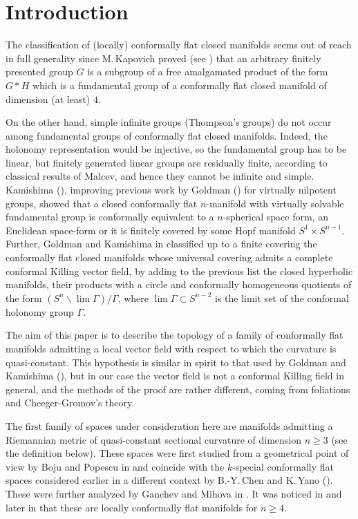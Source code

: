 \documentclass[JEP,XML,SOM,Unicode]{cedram}
\let\moins\smallsetminus
\theoremstyle{definition}
\theoremstyle{remark}
\numberwithin{equation}{section}
\begin{document}
\section{Introduction}
The classification of (locally) conformally flat closed manifolds
seems out of reach in full generality since M.\,Kapovich proved (see \cite{Ka})
that an arbitrary finitely presented group $G$ is a subgroup
of a free amalgamated product of the form
$G * H$ which is a fundamental group of a conformally
flat closed manifold of dimension (at least) $4$.

On the other hand, simple infinite groups (\eg Thompson's groups) do not occur
among fundamental groups of conformally flat closed manifolds. Indeed, the holonomy
representation would be injective, so the fundamental group has to be linear, but finitely generated
linear groups are residually finite, according to classical results of Malcev, and hence they cannot be infinite and simple.
Kamishima (\cite{Kam}), improving previous work by
Goldman (\cite{Go}) for virtually nilpotent groups, showed that a closed conformally flat
$n$-manifold with virtually solvable
fundamental group is conformally equivalent to a
$n$-spherical space form, an Euclidean space-form or it is
finitely covered by some Hopf manifold
$S^1\times S^{n-1}$. Further, Goldman and Kamishima in
\cite{Go-Kam} classified up to a finite covering the conformally flat closed manifolds whose universal covering
admits a complete conformal Killing
vector field, by adding to the previous list the closed
hyperbolic manifolds, their products with a circle
and conformally homogeneous quotients of the form
$(S^n\moins\lim \Gamma)/\Gamma$, where
$\lim \Gamma\subset S^{n-2}$ is the limit set of the conformal
holonomy group $\Gamma$.

The aim of this paper is to describe the
topology of a family of conformally flat
manifolds admitting a local vector field with respect to which
the curvature is quasi-constant. This hypothesis is similar in spirit
to that used by Goldman and Kamishima (\cite{Go-Kam}), but in our case
the vector field is not a conformal Killing field in general,
and the methods of the proof are rather different, coming from foliations and
Cheeger-Gromov's theory.

The first family of spaces under consideration here are manifolds admitting a Riemannian
metric of quasi-constant sectional curvature of dimension $n\geq3$ (see the definition below).
These spaces were first studied from a geometrical point of view
by Boju and Popescu in \cite{BP} and coincide with the
$k$-special conformally flat spaces considered earlier in a different context
by B.-Y.\,Chen and K.\,Yano (\cite{H,CY}). These were further analyzed by Ganchev and Mihova in \cite{GM}.
It was noticed in \cite{BF,H} and later
in \cite{GM} that these are locally conformally flat manifolds for $n\geq4$.
\end{document}
